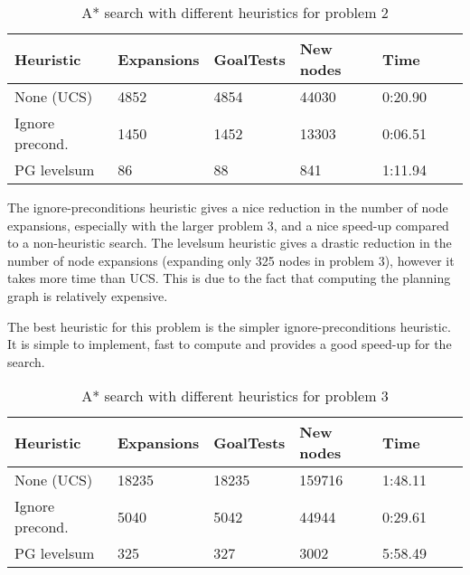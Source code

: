\documentclass[11pt]{article}
\begin{document}
\begin{table}[h]
\begin{center}
\begin{tabular}{|l|l|l|l|l|l|l}
  \hline
  Heuristic & Expansions & GoalTests & New nodes & Time   \\
  \hline
  None (UCS)     & 4852  & 4854      & 44030     & 0:20.90 \\
  \hline
  Ignore precond.& 1450  & 1452      & 13303     & 0:06.51 \\
  \hline
  PG levelsum    & 86    & 88        & 841       & 1:11.94 \\
  \hline
\end{tabular}
\caption{A* search with different heuristics for problem 2} \label{pb2astar}
\end{center}
\end{table}

The ignore-preconditions heuristic gives a nice reduction in the number of node expansions, especially with the larger problem 3, and a nice speed-up compared to a non-heuristic search. The levelsum heuristic gives a drastic reduction in the number of node expansions (expanding only 325 nodes in problem 3), however it takes more time than UCS. This is due to the fact that computing the planning graph is relatively expensive.

The best heuristic for this problem is the simpler ignore-preconditions heuristic. It is simple to implement, fast to compute and provides a good speed-up for the search.

\begin{table}[h]
\begin{center}
\begin{tabular}{|l|l|l|l|l|l|l}
  \hline
  Heuristic & Expansions & GoalTests & New nodes & Time    \\
  \hline
  None (UCS)     & 18235 & 18235     & 159716    & 1:48.11 \\
  \hline
  Ignore precond.& 5040  & 5042      & 44944     & 0:29.61 \\
  \hline
  PG levelsum    & 325   & 327       & 3002      & 5:58.49 \\
  \hline
\end{tabular}
\caption{A* search with different heuristics for problem 3} \label{pb3astar}
\end{center}
\end{table}
\end{document}
